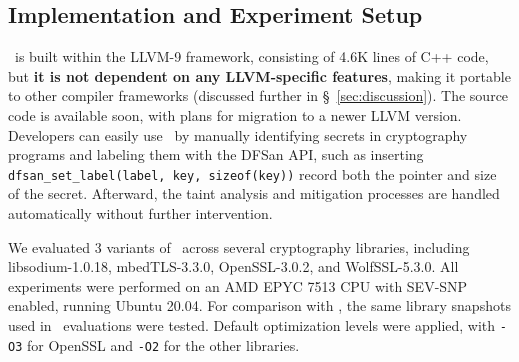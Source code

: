 \subsection{Implementation and Experiment Setup}
\label{sec:implementation}

\tool\ is built within the LLVM-9 framework, consisting of 4.6K lines of C++ code, but \textbf{it is not dependent on any LLVM-specific features}, making it portable to other compiler frameworks (discussed further in \S~\ref{sec:discussion}). 
The source code is available soon, with plans for migration to a newer LLVM version. 
Developers can easily use \tool\ by manually identifying secrets in cryptography programs and labeling them with the DFSan API, such as inserting \texttt{dfsan\_set\_label(label, key, sizeof(key))} record both the pointer and size of the secret.
Afterward, the taint analysis and mitigation processes are handled automatically without further intervention.

We evaluated 3 variants of \tool\ across several cryptography libraries, including libsodium-1.0.18, mbedTLS-3.3.0, OpenSSL-3.0.2, and WolfSSL-5.3.0. 
All experiments were performed on an AMD EPYC 7513 CPU with SEV-SNP enabled, running Ubuntu 20.04. 
For comparison with \ftool, the same library snapshots used in \ftool\ evaluations were tested. 
Default optimization levels were applied, with \texttt{-O3} for OpenSSL and \texttt{-O2} for the other libraries.
